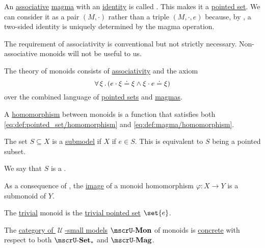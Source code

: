\begin{definition}\label{def:monoid}
  An \hyperref[eq:def:magma/associative]{associative} \hyperref[def:magma]{magma} with an \hyperref[def:magma_identity]{identity} is called . This makes it a \hyperref[def:pointed_set]{pointed set}. We can consider it as a pair \( (M, \cdot) \) rather than a triple \( (M, \cdot, e) \) because, by , a two-sided identity is uniquely determined by the magma operation.

  The requirement of associativity is conventional but not strictly necessary. Non-associative monoids will not be useful to us.

  \begin{thmenum}
     The theory of monoids consists of \hyperref[eq:def:magma/associative]{associativity} and the axiom
    \begin{equation}\label{eq:def:monoid/theory/identity}
      \forall \thinspace \xi \thinspace . \thinspace (e \cdot \xi \doteq \xi \wedge \xi \cdot e \doteq \xi)
    \end{equation}
    over the combined language of \hyperref[def:pointed_set/theory]{pointed sets} and \hyperref[def:magma/theory]{magmas}.

     A \hyperref[def:first_order_homomorphism]{homomorphism} between monoids is a function that satisfies both \eqref{eq:def:pointed_set/homomorphism} and \eqref{eq:def:magma/homomorphism}.

     The set \( S \subseteq X \) is a \hyperref[thm:substructure_is_model]{submodel} if \( X \) if \( e \in S \). This is equivalent to \( S \) being a pointed subset.

    We say that \( S \) is a .

    As a consequence of , the \hyperref[def:multi_valued_function/image]{image} of a monoid homomorphism \( \varphi: X \to Y \) is a submonoid of \( Y \).

     The \hyperref[thm:substructures_form_complete_lattice/bottom]{trivial} monoid is the \hyperref[def:pointed_set/trivial]{trivial pointed set} \( \set{ e } \).

     The \hyperref[def:category_of_small_first_order_models]{category of \( \mscrU \)-small models} \( \ucat{Mon} \) of monoids is \hyperref[def:concrete_category]{concrete} with respect to both \hyperref[def:pointed_set/category]{\( \ucat{Set}_* \)} and \hyperref[def:magma/category]{\( \ucat{Mag} \)}.


\end{thmenum}
\end{definition}
